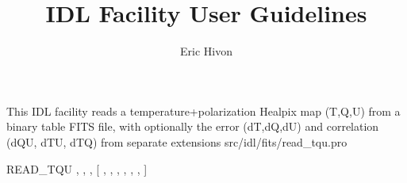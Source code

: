 

\renewcommand{\facname}{{read\_tqu }}
\renewcommand{\FACNAME}{{READ\_TQU }}
\sloppy

\title{\healpix IDL Facility User Guidelines}
 \section[read\_tqu]{ }
\label{idl:read_tqu}
\author{Eric Hivon}

\begin{facility}
{This IDL facility reads a temperature+polarization Healpix map
(T,Q,U) from a binary table FITS file, 
with optionally the error (dT,dQ,dU) and correlation (dQU, dTU, dTQ)
from separate extensions
}
{src/idl/fits/read\_tqu.pro}
\end{facility}

\begin{IDLformat}
{\FACNAME, %
, %
, [%
, %
, %
, %
, %
, %
, %
]}
\end{IDLformat}

